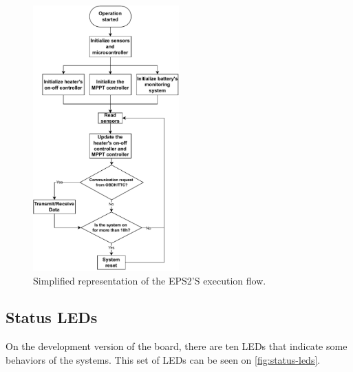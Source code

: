 \begin{figure}[!ht]
    \begin{center}
        \includegraphics[width=0.5\textwidth]{figures/execution_flow.pdf}
        \caption{Simplified representation of the EPS2'S execution flow.}
        \label{fig:execution-flow}
    \end{center}
\end{figure}




\subsection{Status LEDs} \label{status-leds}

On the development version of the board, there are ten LEDs that indicate some behaviors of the systems. This set of LEDs can be seen on \autoref{fig:status-leds}.

